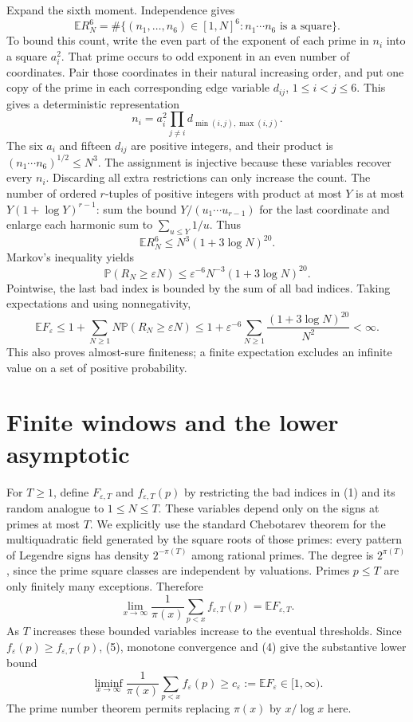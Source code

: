 \documentclass[11pt]{article}
\begin{document}
Expand the sixth moment. Independence gives
\[
 \mathbb E R_N^6
 =\#\{(n_1,\ldots,n_6)\in[1,N]^6:n_1\cdots n_6\text{ is a square}\}. \tag{2}
\]
To bound this count, write the even part of the exponent of each prime in $n_i$ into a square $a_i^2$. That prime occurs to odd exponent in an even number of coordinates. Pair those coordinates in their natural increasing order, and put one copy of the prime in each corresponding edge variable $d_{ij}$, $1\le i<j\le6$. This gives a deterministic representation
\[
 n_i=a_i^2\prod_{j\ne i}d_{\min(i,j),\max(i,j)}.
\]
The six $a_i$ and fifteen $d_{ij}$ are positive integers, and their product is $(n_1\cdots n_6)^{1/2}\le N^3$. The assignment is injective because these variables recover every $n_i$. Discarding all extra restrictions can only increase the count. The number of ordered $r$-tuples of positive integers with product at most $Y$ is at most $Y(1+\log Y)^{r-1}$: sum the bound $Y/(u_1\cdots u_{r-1})$ for the last coordinate and enlarge each harmonic sum to $\sum_{u\le Y}1/u$. Thus
\[
 \mathbb E R_N^6\le N^3(1+3\log N)^{20}. \tag{3}
\]
Markov's inequality yields
\[
 \mathbb P(R_N\ge\varepsilon N)
 \le\varepsilon^{-6}N^{-3}(1+3\log N)^{20}.
\]
Pointwise, the last bad index is bounded by the sum of all bad indices. Taking expectations and using nonnegativity,
\[
 \mathbb E F_\varepsilon
 \le1+\sum_{N\ge1}N\mathbb P(R_N\ge\varepsilon N)
 \le1+\varepsilon^{-6}\sum_{N\ge1}\frac{(1+3\log N)^{20}}{N^2}<\infty. \tag{4}
\]
This also proves almost-sure finiteness; a finite expectation excludes an infinite value on a set of positive probability.

\section*{Finite windows and the lower asymptotic}
For $T\ge1$, define $F_{\varepsilon,T}$ and $f_{\varepsilon,T}(p)$ by restricting the bad indices in (1) and its random analogue to $1\le N\le T$. These variables depend only on the signs at primes at most $T$. We explicitly use the standard Chebotarev theorem for the multiquadratic field generated by the square roots of those primes: every pattern of Legendre signs has density $2^{-\pi(T)}$ among rational primes. The degree is $2^{\pi(T)}$, since the prime square classes are independent by valuations. Primes $p\le T$ are only finitely many exceptions. Therefore
\[
 \lim_{x\to\infty}\frac1{\pi(x)}\sum_{p<x}f_{\varepsilon,T}(p)
 =\mathbb E F_{\varepsilon,T}. \tag{5}
\]
As $T$ increases these bounded variables increase to the eventual thresholds. Since $f_\varepsilon(p)\ge f_{\varepsilon,T}(p)$, (5), monotone convergence and (4) give the substantive lower bound
\[
 \liminf_{x\to\infty}\frac1{\pi(x)}\sum_{p<x}f_\varepsilon(p)
 \ge c_\varepsilon:=\mathbb E F_\varepsilon\in[1,\infty). \tag{6}
\]
The prime number theorem permits replacing $\pi(x)$ by $x/\log x$ here.
\end{document}
